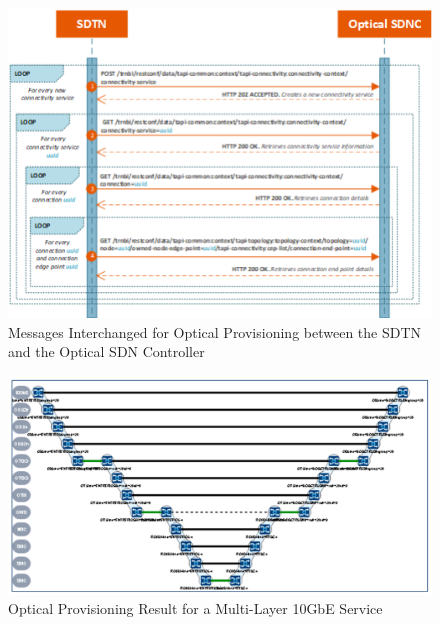 \documentclass[a4paper,fleqn]{cas-dc}
\begin{document}
\begin{figure}
	\centering
		\includegraphics[width=\linewidth]{figs/optical_provisioning_workflow_2.png}
	\caption{Messages Interchanged for Optical Provisioning between the SDTN and the Optical SDN Controller}
	\label{FIG:optical_provisioning_workflow}
\end{figure}

\begin{figure}
	\centering
		\includegraphics[width=\linewidth]{figs/optical_provisioning_result.png}
	\caption{Optical Provisioning Result for a Multi-Layer 10GbE Service}
	\label{FIG:optical_provisioning_result}
\end{figure}
\end{document}
